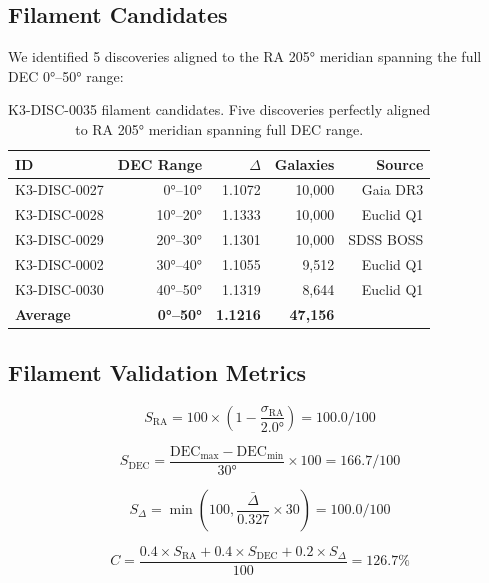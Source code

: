\documentclass[11pt,a4paper]{article}
\begin{document}
\subsection{Filament Candidates}

We identified 5 discoveries aligned to the RA 205° meridian spanning the full DEC 0°--50° range:

\begin{table}[h]
\centering
\begin{tabular}{lrrrr}
\toprule
\textbf{ID} & \textbf{DEC Range} & $\Delta$ & \textbf{Galaxies} & \textbf{Source} \\
\midrule
K3-DISC-0027 & 0°--10° & 1.1072 & 10,000 & Gaia DR3 \\
K3-DISC-0028 & 10°--20° & 1.1333 & 10,000 & Euclid Q1 \\
K3-DISC-0029 & 20°--30° & 1.1301 & 10,000 & SDSS BOSS \\
K3-DISC-0002 & 30°--40° & 1.1055 & 9,512 & Euclid Q1 \\
K3-DISC-0030 & 40°--50° & 1.1319 & 8,644 & Euclid Q1 \\
\midrule
\textbf{Average} & \textbf{0°--50°} & \textbf{1.1216} & \textbf{47,156} & \\
\bottomrule
\end{tabular}
\caption{K3-DISC-0035 filament candidates. Five discoveries perfectly aligned to RA 205° meridian spanning full DEC range.}
\label{tab:filament_candidates}
\end{table}

\subsection{Filament Validation Metrics}

\begin{equation}
S_{\text{RA}} = 100 \times \left(1 - \frac{\sigma_{\text{RA}}}{2.0°}\right) = 100.0/100
\end{equation}

\begin{equation}
S_{\text{DEC}} = \frac{\text{DEC}_{\text{max}} - \text{DEC}_{\text{min}}}{30°} \times 100 = 166.7/100
\end{equation}

\begin{equation}
S_{\Delta} = \min\left(100, \frac{\bar{\Delta}}{0.327} \times 30\right) = 100.0/100
\end{equation}

\begin{equation}
C = \frac{0.4 \times S_{\text{RA}} + 0.4 \times S_{\text{DEC}} + 0.2 \times S_{\Delta}}{100} = 126.7\%
\end{equation}
\end{document}

